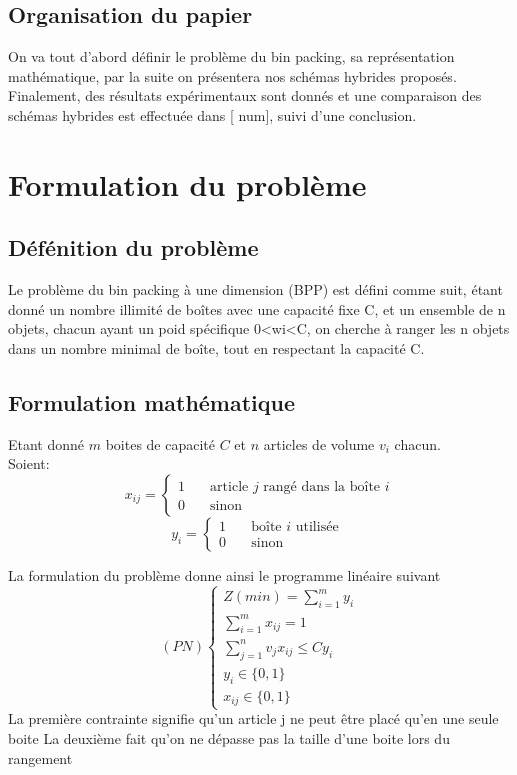 \documentclass[preprint]{elsarticle}
\begin{document}
 
 \subsection{Organisation du papier}
 On va tout d’abord définir le problème du bin packing, sa représentation mathématique, par la suite on présentera nos schémas hybrides proposés. Finalement, des résultats expérimentaux sont donnés et une comparaison des schémas hybrides est effectuée  dans [ num], suivi d’une conclusion.

\section{Formulation du problème}
\subsection{Défénition du problème}
Le problème du bin packing à une dimension (BPP) est défini comme suit, étant donné un nombre illimité de boîtes avec une capacité fixe C, et un ensemble de n objets, chacun ayant un poid spécifique 0<wi<C, on cherche à ranger les n objets dans un nombre minimal de boîte, tout en respectant la capacité C. 

\subsection{Formulation mathématique}
Etant donné \(m\) boites de capacité \(C\) et \(n\) articles de volume \(v_i\) chacun. \\
    Soient: 
    \[ x_{ij} =
        \begin{cases}
            1  & \quad \text{article } j \text{ rangé dans la boîte } i \\
            0  & \quad \text{sinon } 
        \end{cases}
    \]
    \[ y_i =
    \begin{cases}
        1  & \quad \text{boîte } i \text{ utilisée } \\
        0  & \quad \text{sinon } 
    \end{cases}
    \]

La formulation du problème donne ainsi le programme linéaire suivant
\[(PN)
    \begin{cases}
        Z(min) = \displaystyle\sum_{i=1}^{m} y_i \\
        \displaystyle\sum_{i=1}^{m} x_{ij}  = 1 \\
        \displaystyle\sum_{j=1}^{n} v_j x_{ij} \le C y_i \\
        y_i \in \{0,1\} \\
        x_{ij} \in \{0,1\} 
    \end{cases}
\]  
La première contrainte signifie qu’un article j ne peut être placé qu’en une seule boite
La deuxième fait qu’on ne dépasse pas la taille d’une boite lors du rangement
\end{document}

